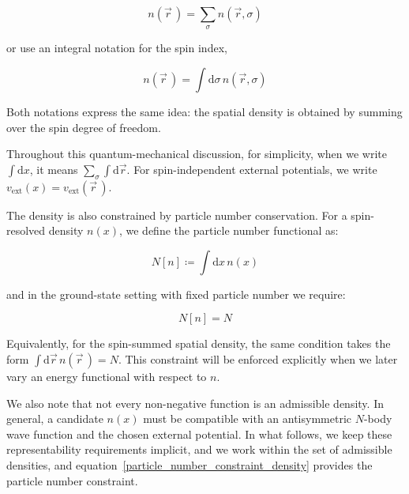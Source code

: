 \begin{equation}
    n(\vec{r}\,)=\sum_{\sigma} n(\vec{r},\sigma)
\label{sum_spatial_density}
\end{equation}

or use an integral notation for the spin index,

\begin{equation}
    n(\vec{r}\,)=\int\mathrm{d}\sigma\,n(\vec{r},\sigma)
\label{integral_spatial_density}
\end{equation}

Both notations express the same idea: the spatial density is obtained by summing over the spin degree of freedom.


Throughout this quantum-mechanical discussion, for simplicity, when we write $\int\mathrm{d}x$, it means $\sum_{\sigma}\int\mathrm{d}\vec{r}$.
For spin-independent external potentials, we write $v_\mathrm{ext}(x)=v_\mathrm{ext}(\vec{r}\,)$.

The density is also constrained by particle number conservation.
For a spin-resolved density $n(x)$, we define the particle number functional as:

\begin{equation}
    N[n]\coloneqq\int\mathrm{d}x\,n(x)
\label{particle_number_functional}
\end{equation}

and in the ground-state setting with fixed particle number we require:

\begin{equation}
    N[n]=N
\label{particle_number_constraint_density}
\end{equation}

Equivalently, for the spin-summed spatial density, the same condition takes the form $\int \mathrm{d}\vec{r}\,n(\vec{r}\,)=N$.
This constraint will be enforced explicitly when we later vary an energy functional with respect to $n$.

We also note that not every non-negative function is an admissible density.
In general, a candidate $n(x)$ must be compatible with an antisymmetric $N$-body wave function and the chosen external potential.
In what follows, we keep these representability requirements implicit,
and we work within the set of admissible densities, and equation~\eqref{particle_number_constraint_density} provides the particle number constraint.

